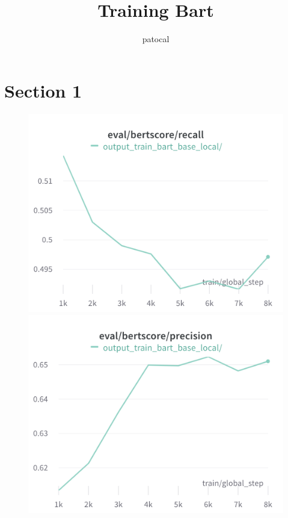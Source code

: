 \documentclass{article}
\title{Training Bart}
\author{%
patocal
}
\begin{document}
\maketitle

\section{Section 1}

\begin{figure}[!htb]
\includegraphics[width=\linewidth]{charts/Section-2-Panel-0-5gq0m8uvz}
\caption{}
\endminipage\hfill
{}
\includegraphics[width=\linewidth]{charts/Section-2-Panel-1-omp5lgv1w}
\caption{}
\endminipage
\end{figure}
\end{document}
